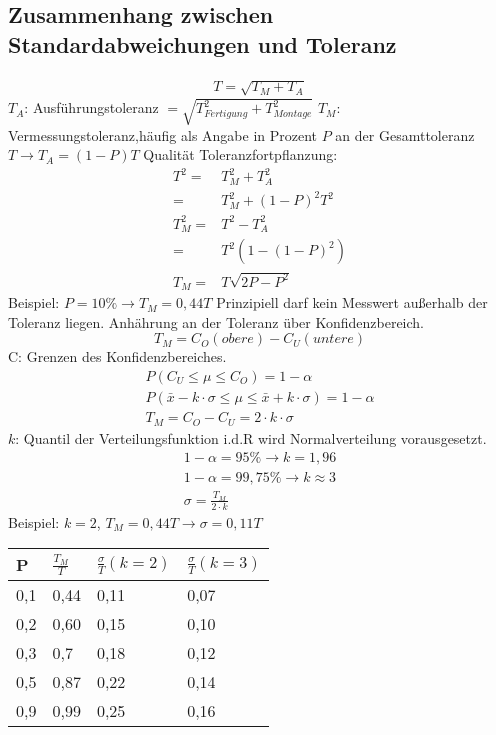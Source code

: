 \documentclass[12pt]{article}
\begin{document}
\subsection{Zusammenhang zwischen Standardabweichungen und Toleranz}
\begin{gather*}
T = \sqrt{T_M + T_A}
\end{gather*}
 $T_A$: Ausführungstoleranz $= \sqrt{T_{Fertigung}^2 + T_{Montage}^2}$ \newline
 $T_M$: Vermessungstoleranz,häufig als Angabe in Prozent $P$ an der Gesamttoleranz $T \rightarrow T_A = (1-P)T$ \newline
 Qualität Toleranzfortpflanzung:
 \begin{align*}
 T^2 = & T_M^2 + T_A^2 \\
 = & T_M^2 + (1-P)^2 T^2 \\
 T_M^2 = & T^2 - T_A^2 \\
 = & T^2 (1-(1-P)^2)	\\
 T_M = & T \sqrt{2P-P^2}
 \end{align*}
 Beispiel: $P = 10 \% \longrightarrow T_M = 0,44T$ \newline
 Prinzipiell darf kein Messwert außerhalb der Toleranz liegen. \newline
 Anhährung an der Toleranz über Konfidenzbereich.
 \begin{equation*}
 T_M = C_O(obere) - C_U(untere)
 \end{equation*}
 C: Grenzen des Konfidenzbereiches.
 \begin{gather*}
 P(C_U \leq \mu \leq C_O) = 1-\alpha \\
 P(\bar{x} - k \cdot \sigma \leq \mu \leq \bar{x} + k \cdot \sigma) = 1-\alpha \\
 T_M = C_O - C_U = 2 \cdot k \cdot \sigma
 \end{gather*}
 $k$: Quantil der Verteilungsfunktion i.d.R wird Normalverteilung vorausgesetzt.
 \begin{gather*}
 1-\alpha = 95\% \longrightarrow k=1,96 \\
 1-\alpha = 99,75\% \longrightarrow k \approx 3 \\
 \sigma = \frac{T_M}{2 \cdot k}
 \end{gather*}
 Beispiel: $k=2$, $T_M = 0,44T \longrightarrow \sigma = 0,11T$
 \begin{table}[ht] \centering
 	\begin{tabular}{|l|l|l|l|}
 		\hline
 		P   &  $\frac{T_M}{T}$    &  $\frac{\sigma}{T} (k=2)$    &   $\frac{\sigma}{T} (k=3)$   \\ \hline
 		0,1 & 0,44 & 0,11 & 0,07 \\ \hline
 		0,2 & 0,60 & 0,15 & 0,10 \\ \hline
 		0,3 & 0,7  & 0,18 & 0,12 \\ \hline
 		0,5 & 0,87 & 0,22 & 0,14 \\ \hline
 		0,9 & 0,99 & 0,25 & 0,16 \\ \hline
 	\end{tabular}
 \end{table}
\end{document}
